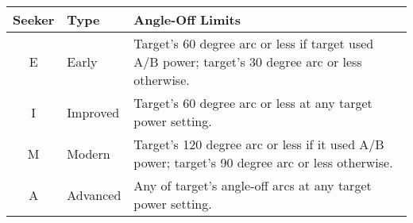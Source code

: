 \begin{onecolumntable}
\begin{tabularx}{\linewidth}{clP}
\toprule
Seeker  &Type       &Angle-Off Limits\\
\midrule
E       &Early      &Target's 60 degree arc or less if target used A/B power; target's 30 degree arc or less otherwise.\\
I       &Improved   &Target's 60 degree arc or less at any target power setting.\\
M       &Modern	    &Target's 120 degree arc or less if it used A/B power; target's 90 degree arc or less otherwise.\\
A       &Advanced   &Any of target's angle-off arcs at any target power setting.\\
\bottomrule
\end{tabularx}
\end{onecolumntable}
